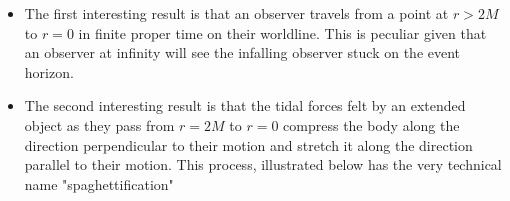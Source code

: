 \documentclass[11pt,table]{article}
\begin{document}
            \begin{itemize}
                \item The first interesting result is that an observer travels from a point at $r>2M$ to $r=0$ in finite proper time on their worldline.  This is peculiar given that an observer at infinity will see the infalling observer stuck on the event horizon.
                \item The second interesting result is that the tidal forces felt by an extended object as they pass from $r=2M$ to $r=0$ compress the body along the direction perpendicular to their motion and stretch it along the direction parallel to their motion. This process, illustrated below has the very technical name "spaghettification"
                \begin{center}
                    

                


                \begin{tikzpicture}[x=0.75pt,y=0.75pt,yscale=-1,xscale=1]


\end{tikzpicture}
\end{center}
\end{itemize}
\end{document}
